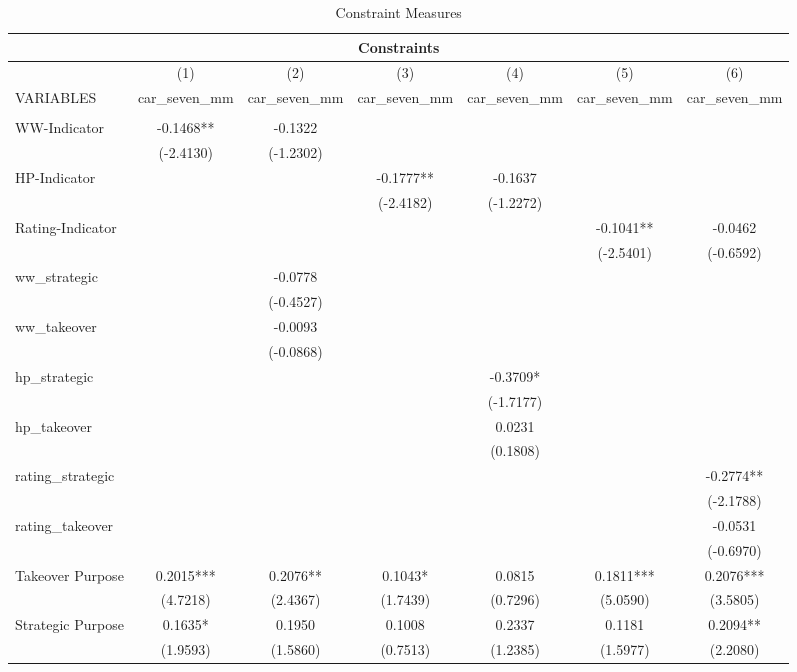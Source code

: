 \documentclass[12pt]{article}
\begin{document}
\begin{table}[ht]
	\centering
	\caption{Constraint Measures}
	\begin{adjustbox}{max width=\textwidth}
		\begin{tabular}{lcccccc}
			\multicolumn{7}{c}{Constraints} \\ \hline
			& (1) & (2) & (3) & (4) & (5) & (6) \\
			VARIABLES & car\_seven\_mm & car\_seven\_mm & car\_seven\_mm & car\_seven\_mm & car\_seven\_mm & car\_seven\_mm \\ \hline
			&  &  &  &  &  &  \\
			WW-Indicator & -0.1468** & -0.1322 &  &  &  &  \\
			& (-2.4130) & (-1.2302) &  &  &  &  \\
			HP-Indicator &  &  & -0.1777** & -0.1637 &  &  \\
			&  &  & (-2.4182) & (-1.2272) &  &  \\
			Rating-Indicator &  &  &  &  & -0.1041** & -0.0462 \\
			&  &  &  &  & (-2.5401) & (-0.6592) \\
			ww\_strategic &  & -0.0778 &  &  &  &  \\
			&  & (-0.4527) &  &  &  &  \\
			ww\_takeover &  & -0.0093 &  &  &  &  \\
			&  & (-0.0868) &  &  &  &  \\
			hp\_strategic &  &  &  & -0.3709* &  &  \\
			&  &  &  & (-1.7177) &  &  \\
			hp\_takeover &  &  &  & 0.0231 &  &  \\
			&  &  &  & (0.1808) &  &  \\
			rating\_strategic &  &  &  &  &  & -0.2774** \\
			&  &  &  &  &  & (-2.1788) \\
			rating\_takeover &  &  &  &  &  & -0.0531 \\
			&  &  &  &  &  & (-0.6970) \\
			Takeover Purpose & 0.2015*** & 0.2076** & 0.1043* & 0.0815 & 0.1811*** & 0.2076*** \\
			& (4.7218) & (2.4367) & (1.7439) & (0.7296) & (5.0590) & (3.5805) \\
			Strategic Purpose & 0.1635* & 0.1950 & 0.1008 & 0.2337 & 0.1181 & 0.2094** \\
			& (1.9593) & (1.5860) & (0.7513) & (1.2385) & (1.5977) & (2.2080) \\

\end{tabular}
\end{adjustbox}
\end{table}
\end{document}

